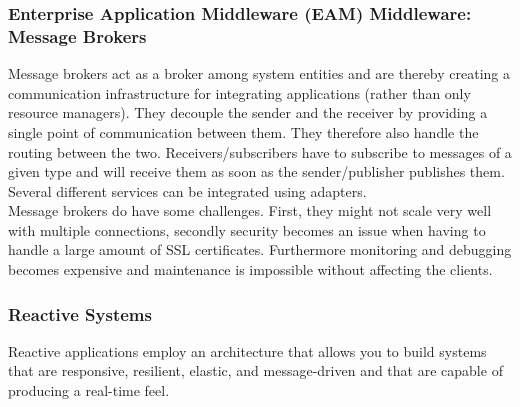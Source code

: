 \subsubsection{Enterprise Application Middleware (EAM) Middleware: Message Brokers}
Message brokers act as a broker among system entities and are thereby creating a communication infrastructure for integrating applications (rather than only resource managers).
They decouple the sender and the receiver by providing a single point of communication between them.
They therefore also handle the routing between the two.
Receivers/subscribers have to subscribe to messages of a given type and will receive them as soon as the sender/publisher publishes them.
Several different services can be integrated using adapters.\\
Message brokers do have some challenges.
First, they might not scale very well with multiple connections, secondly security becomes an issue when having to handle a large amount of SSL certificates.
Furthermore monitoring and debugging becomes expensive and maintenance is impossible without affecting the clients.

\subsubsection{Reactive Systems}
Reactive applications employ an architecture that allows you to build systems that are responsive, resilient, elastic, and message-driven and that are capable of producing a real-time feel.

